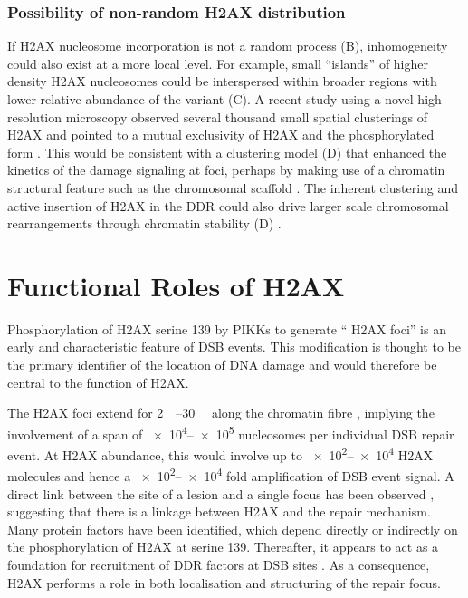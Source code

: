 \subsubsection{Possibility of non-random H2AX distribution}
If H2AX nucleosome incorporation is not a random process
(B), inhomogeneity could also
exist at a more local level. For example, small ``islands'' of higher
density H2AX nucleosomes could be interspersed within broader regions
with lower relative abundance of the variant
(C). A recent study using a
novel high-resolution microscopy observed several thousand small
spatial clusterings of H2AX and pointed to a mutual exclusivity of
H2AX and the phosphorylated form \citep{JBBTB06}. This would be
consistent with a clustering model
(D) that enhanced the kinetics
of the damage signaling at foci, perhaps by making use of a chromatin
structural feature such as the chromosomal scaffold
\citep{JBBTB06}. The inherent clustering and active insertion of H2AX
in the DDR could also drive larger scale chromosomal rearrangements
through chromatin stability
(D) \citep{KHHK+08}.

\section{Functional Roles of H2AX}
Phosphorylation of H2AX serine 139 by PIKKs to generate ``\textgamma
H2AX foci'' is an early and characteristic feature of DSB events. This
modification is thought to be the primary identifier of the location
of DNA damage and would therefore be central to the function of H2AX.

The \textgamma H2AX foci extend for \SIrange{2}{30}{\mega\bp} along
the chromatin fibre \citep{EPR+99}, implying the involvement of a span
of \numrange{e4}{e5} nucleosomes per individual DSB repair event. At
 H2AX abundance, this would involve up to \numrange{e2}{e4}
H2AX molecules and hence a \numrange{e2}{e4} fold amplification of DSB
event signal. A direct link between the site of a lesion and a single
focus has been observed \citep{KRIK+03}, suggesting that there is a
linkage between \textgamma H2AX and the repair mechanism. Many protein
factors have been identified, which depend directly or indirectly on
the phosphorylation of H2AX at serine 139. Thereafter, it appears to
act as a foundation for recruitment of DDR factors at DSB sites
\citep{TTP+00}. As a consequence, H2AX performs a role in both
localisation and structuring of the repair focus.

